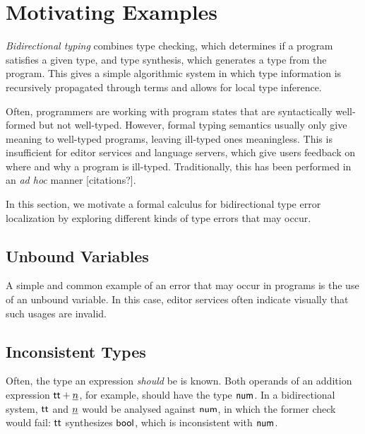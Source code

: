 \section{Motivating Examples}
\emph{Bidirectional typing} combines type checking, which determines if a program satisfies a given
type, and type synthesis, which generates a type from the program. This gives a simple algorithmic
system in which type information is recursively propagated through terms and allows for local type
inference.


Often, programmers are working with program states that are syntactically well-formed but not
well-typed. However, formal typing semantics usually only give meaning to well-typed programs,
leaving ill-typed ones meaningless. This is insufficient for editor services and language servers,
which give users feedback on where and why a program is ill-typed. Traditionally, this has been
performed in an \emph{ad hoc} manner [citations?].

In this section, we motivate a formal calculus for bidirectional type error localization by
exploring different kinds of type errors that may occur.


\subsection{Unbound Variables}
A simple and common example of an error that may occur in programs is the use of an unbound
variable. In this case, editor services often indicate visually that such usages are invalid.


\subsection{Inconsistent Types}
Often, the type an expression \emph{should} be is known. Both operands of an addition expression
${\normalfont\textsf{tt}} + \underline{n}$, for example, should have the type ${\normalfont\textsf{num}}$. In a bidirectional system,
${\normalfont\textsf{tt}}$ and $\underline{n}$ would be analysed against ${\normalfont\textsf{num}}$, in which the former check would fail:
${\normalfont\textsf{tt}}$ synthesizes ${\normalfont\textsf{bool}}$, which is inconsistent with ${\normalfont\textsf{num}}$.

